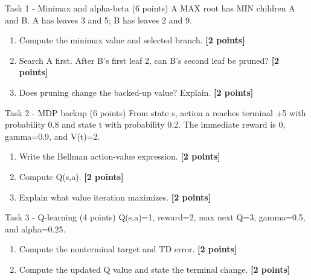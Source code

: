 \documentclass[aspectratio=169,11pt]{beamer}
\begin{document}
\begin{frame}{Task 1 - Minimax and alpha-beta (6 points)}
\small
A MAX root has MIN children A and B. A has leaves 3 and 5; B has leaves 2 and 9.

\vspace{0.2cm}
\begin{enumerate}
\item[\textbf{a.}] Compute the minimax value and selected branch. \hfill{\color{courseblue}\textbf{[2 points]}}
\item[\textbf{b.}] Search A first. After B's first leaf 2, can B's second leaf be pruned? \hfill{\color{courseblue}\textbf{[2 points]}}
\item[\textbf{c.}] Does pruning change the backed-up value? Explain. \hfill{\color{courseblue}\textbf{[2 points]}}
\end{enumerate}
\end{frame}

\begin{frame}{Task 2 - MDP backup (6 points)}
\small
From state s, action a reaches terminal +5 with probability 0.8 and state t with probability 0.2. The immediate reward is 0, gamma=0.9, and V(t)=2.

\vspace{0.2cm}
\begin{enumerate}
\item[\textbf{a.}] Write the Bellman action-value expression. \hfill{\color{courseblue}\textbf{[2 points]}}
\item[\textbf{b.}] Compute Q(s,a). \hfill{\color{courseblue}\textbf{[2 points]}}
\item[\textbf{c.}] Explain what value iteration maximizes. \hfill{\color{courseblue}\textbf{[2 points]}}
\end{enumerate}
\end{frame}

\begin{frame}{Task 3 - Q-learning (4 points)}
\small
Q(s,a)=1, reward=2, max next Q=3, gamma=0.5, and alpha=0.25.

\vspace{0.2cm}
\begin{enumerate}
\item[\textbf{a.}] Compute the nonterminal target and TD error. \hfill{\color{courseblue}\textbf{[2 points]}}
\item[\textbf{b.}] Compute the updated Q value and state the terminal change. \hfill{\color{courseblue}\textbf{[2 points]}}
\end{enumerate}
\end{frame}
\end{document}
